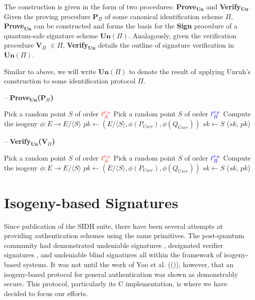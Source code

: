 The construction is given in the form of two procedures: \textbf{Prove}$_{\textbf{Un}}$ and \textbf{Verify}$_{\textbf{Un}}$. Given the proving procedure \textbf{P}$_{\Pi}$ of some canonical identification scheme $\Pi$, \textbf{Prove}$_{\textbf{Un}}$ can be constructed and forms the basis for the \textbf{Sign} procedure of a quantum-safe signature scheme $\textbf{Un}(\Pi)$. Analagously, given the verification procedure \textbf{V}$_{\Pi}$ $\in \Pi$, \textbf{Verify}$_{\textbf{Un}}$ details the outline of signature verification in $\textbf{Un}(\Pi)$.

Similar to above, we will write $\textbf{Un}(\Pi)$ to denote the result of applying Unruh's construction to some identification protocol $\Pi$.

\begin{algorithm}
\caption{-- \textbf{Prove$_{\textbf{Un}}$(\textbf{P}$_{\Pi}$)}}
\label{alg:unruhprove}
\begin{algorithmic}[1]
	\State Pick a random point $S$ of order $\textcolor{red}{\ell_{A}^{e_A}}$
\EndIf
{}
	\State Pick a random point $S$ of order $\textcolor{blue}{\ell_{B}^{e_B}}$
\EndIf
\State Compute the isogeny $\phi: E \rightarrow E/\langle S \rangle$
\State $pk \gets (E/\langle S \rangle, \phi(P_{User}), \phi(Q_{User}))$
\State $sk \gets S$
\State \Return ($sk$, $pk$)
\end{algorithmic}
\end{algorithm}

\begin{algorithm}
\caption{-- \textbf{Verify$_{\textbf{Un}}$(\textbf{V}$_{\Pi}$)}}
\label{alg:unruhverif}
\begin{algorithmic}[1]
	\State Pick a random point $S$ of order $\textcolor{red}{\ell_{A}^{e_A}}$
\EndIf
{}
	\State Pick a random point $S$ of order $\textcolor{blue}{\ell_{B}^{e_B}}$
\EndIf
\State Compute the isogeny $\phi: E \rightarrow E/\langle S \rangle$
\State $pk \gets (E/\langle S \rangle, \phi(P_{User}), \phi(Q_{User}))$
\State $sk \gets S$
\State \Return ($sk$, $pk$)
\end{algorithmic}
\end{algorithm}

\section{Isogeny-based Signatures}
\label{sec:sigsbackground}

Since publication of the SIDH suite, there have been several attempts at providing authentication schemes using the same primitives. The post-quantum community had demonstrated undeniable signatures \cite{jvsig}, designated verifier signatures \cite{sunsig}, and undeniable blind signatures \cite{seshsig} all within the framework of isogeny-based systems. It was not until the work of Yoo et al. ((\cite{yoo})), however, that an isogeny-based protocol for general authentication was shown as demonstrably secure. This protocol, particularly its C implementation, is where we have decided to focus our efforts.

